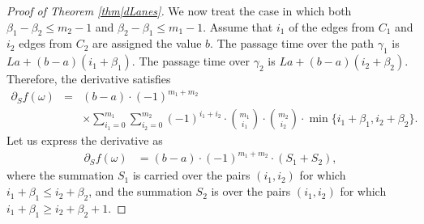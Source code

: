 \documentclass[reqno]{amsart}
\begin{document}
\begin{appendix}
\begin{proof}[Proof of Theorem \ref{thm|dLanes}]
We now treat the case in which both $\beta_1-\beta_2\leq m_2-1$ and $\beta_2-\beta_1\leq m_1-1$. Assume that $i_1$ of the edges from $C_1$ and $i_2$ edges from $C_2$ are assigned the value $b$. The passage time over the path $\gamma_1$ is $La+(b-a)(i_1+\beta_1)$. The passage time over $\gamma_2$ is $La+(b-a)(i_2+\beta_2)$. Therefore, the derivative satisfies 
\begin{eqnarray*}
\partial_Sf(\omega)&=&(b-a)\cdot(-1)^{m_1+m_2}\\ 
&&\times\sum_{i_1=0}^{m_1}\sum_{i_2=0}^{m_2}(-1)^{i_1+i_2}\cdot \binom{m_1}{i_1}\cdot\binom{m_2}{i_2}\cdot \min\{i_1+\beta_1,i_2+\beta_2\}.
\end{eqnarray*}
Let us express the derivative as 
\begin{align}
\partial_Sf(\omega)&=(b-a)\cdot(-1)^{m_1+m_2}\cdot(S_1+S_2), \label{eqn|S1PlusS2}
\end{align}
where the summation $S_1$ is carried over the pairs $(i_1,i_2)$ for which $i_1+\beta_1\leq i_2+\beta_2$, and the summation $S_2$ is over the pairs $(i_1,i_2)$ for which $i_1+\beta_1\geq i_2+\beta_2+1$. 


\end{proof}
\end{appendix}
\end{document}
